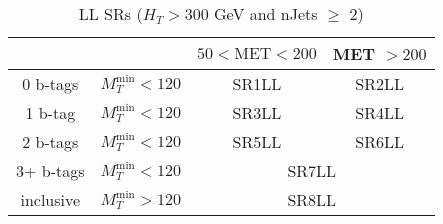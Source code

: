 \documentclass[plain,landscape]{article}
\begin{document}
\begin{table}
\centering
\begin{tabular}{|c|c|c|c|}
\hline
&  & $50 < \textrm{MET} < 200$ & MET $> 200$ \\
\hline
0 b-tags & $M_T^{\textrm{min}} < 120$ & SR1LL & SR2LL \\
\hline
1 b-tag & $M_T^{\textrm{min}} < 120$ & SR3LL & SR4LL \\
\hline
2 b-tags & $M_T^{\textrm{min}} < 120$ & SR5LL & SR6LL \\
\hline
3+ b-tags & $M_T^{\textrm{min}} < 120$ & \multicolumn{2}{|c|}{SR7LL} \\
\hline
inclusive & $M_T^{\textrm{min}} > 120$ & \multicolumn{2}{|c|}{SR8LL} \\ 
\hline
\end{tabular}
\caption{LL SRs ($H_T > 300$ GeV and nJets $\geq$ 2)}
\end{table}
\end{document}
